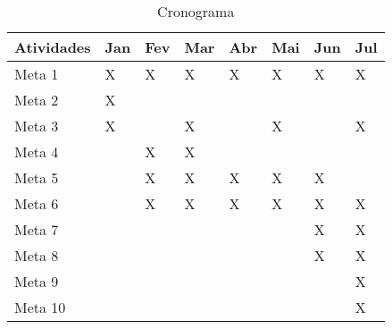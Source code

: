 \begin{table}[htb]
  \centering
  \caption[Cronograma]{Cronograma}
  \label{tabCrono}
  \begin{tabular}{llllllll}
    \textbf{Atividades} & \textbf{Jan} & \textbf{Fev} & \textbf{Mar} & \textbf{Abr} & \textbf{Mai} & \textbf{Jun} & \textbf{Jul} \\
    \hline
    Meta 1          & X   & X   & X   & X   & X   & X   & X   \\
    Meta 2  		& X   &     &     &     &     &     &     \\
    Meta 3      	& X   &     & X   &     & X   &     & X   \\
    Meta 4 	        &     & X   & X   &     &     &     &     \\
    Meta 5 	        &     & X   & X   & X   & X   & X   &     \\
    Meta 6 			&     & X   & X   & X   & X   & X   & X   \\
    Meta 7 			&     &     &     &     &     & X   & X   \\
    Meta 8 			&     &     &     &     &     & X   & X   \\
    Meta 9 			&     &     &     &     &     &     & X   \\
    Meta 10 		&     &     &     &     &     &     & X   \\
    \hline
  \end{tabular}
\end{table}








